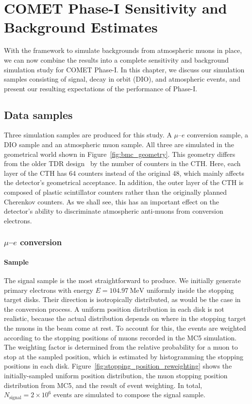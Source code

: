 \chapter{COMET Phase-I Sensitivity and Background Estimates}

With the framework to simulate backgrounds from atmospheric muons in place, we
can now combine the results into a complete sensitivity and background
simulation study for COMET Phase-I. In this chapter, we discuss our simulation
samples consisting of signal, decay in orbit (DIO), and atmospheric events, and
present our resulting expectations of the performance of Phase-I.

\section{Data samples}
Three simulation samples are produced for this study. A $\mu$--$e$ conversion
sample, a DIO sample and an atmospheric muon sample. All three are simulated in
the geometrical world shown in Figure~\ref{fig:bmc_geometry}. This geometry
differs from the older TDR design~\cite{the_comet_collaboration_comet_2020} by
the number of counters in the CTH. Here, each layer of the CTH has 64 counters
instead of the original 48, which mainly affects the detector's geometrical
acceptance. In addition, the outer layer of the CTH is composed of plastic
scintillator counters rather than the originally planned Cherenkov counters. As
we shall see, this has an important effect on the detector's ability to
discriminate atmospheric anti-muons from conversion electrons.

\subsection{\texorpdfstring{$\mu$--$e$}{Muon to electron} conversion} 

\subsubsection{Sample}

The signal sample is the most straightforward to produce. We initially generate
primary electrons with energy $E=\SI{104.97}{\MeV}$ uniformly inside the
stopping target disks. Their direction is isotropically distributed, as would be
the case in the conversion process. A uniform position distribution in each disk
is not realistic, because the actual distribution depends on where in the
stopping target the muons in the beam come at rest. To account for this, the
events are weighted according to the stopping positions of muons recorded in the
MC5 simulation. The weighting factor is determined from the relative probability
for a muon to stop at the sampled position, which is estimated by histogramming
the stopping positions in each disk.
Figure~\ref{fig:stopping_position_reweighting} shows the initially-sampled
uniform position distribution, the muon stopping position distribution from MC5,
and the result of event weighting. In total, $N_\mathrm{signal} =
2\times 10^6$ events are simulated to compose the signal sample.

